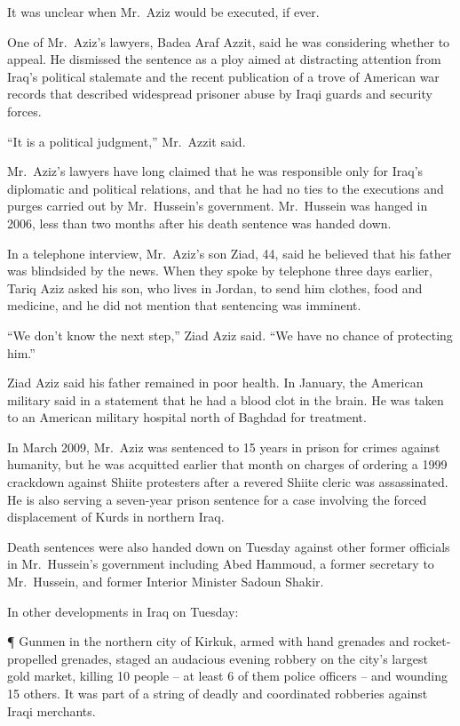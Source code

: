 ﻿\documentclass[12pt]{article}
\begin{document}
It was unclear when Mr.~Aziz would be executed, if ever.

One of Mr.~Aziz's lawyers, Badea Araf Azzit, said he was considering whether to appeal. He dismissed
the sentence as a ploy aimed at distracting attention from Iraq's political stalemate and the recent
publication of a trove of American war records that described widespread prisoner abuse by Iraqi
guards and security forces.

``It is a political judgment,'' Mr.~Azzit said.

Mr.~Aziz's lawyers have long claimed that he was responsible only for Iraq's diplomatic and
political relations, and that he had no ties to the executions and purges carried out by
Mr.~Hussein's government. Mr.~Hussein was hanged in 2006, less than two months after his death
sentence was handed down.

In a telephone interview, Mr.~Aziz's son Ziad, 44, said he believed that his father was blindsided
by the news. When they spoke by telephone three days earlier, Tariq Aziz asked his son, who lives in
Jordan, to send him clothes, food and medicine, and he did not mention that sentencing was imminent.

``We don't know the next step,'' Ziad Aziz said. ``We have no chance of protecting him.''

Ziad Aziz said his father remained in poor health. In January, the American military said in a
statement that he had a blood clot in the brain. He was taken to an American military hospital north
of Baghdad for treatment.

In March 2009, Mr.~Aziz was sentenced to 15 years in prison for crimes against humanity, but he was
acquitted earlier that month on charges of ordering a 1999 crackdown against Shiite protesters after
a revered Shiite cleric was assassinated. He is also serving a seven-year prison sentence for a case
involving the forced displacement of Kurds in northern Iraq.

Death sentences were also handed down on Tuesday against other former officials in Mr.~Hussein's
government including Abed Hammoud, a former secretary to Mr.~Hussein, and former Interior Minister
Sadoun Shakir.

In other developments in Iraq on Tuesday:

¶ Gunmen in the northern city of Kirkuk, armed with hand grenades and rocket-propelled grenades,
staged an audacious evening robbery on the city's largest gold market, killing 10 people -- at least
6 of them police officers -- and wounding 15 others. It was part of a string of deadly and
coordinated robberies against Iraqi merchants.
\end{document}
